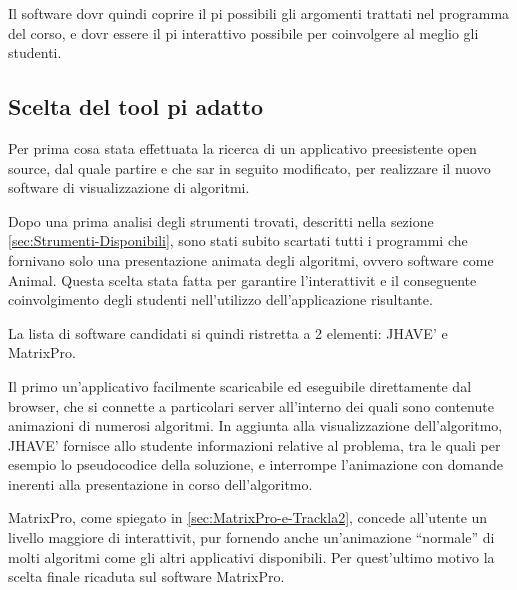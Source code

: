 Il software dovr quindi coprire il pi possibili gli argomenti trattati
nel programma del corso, e dovr essere il pi interattivo possibile
per coinvolgere al meglio gli studenti.


\subsection{Scelta del tool pi adatto}

Per prima cosa  stata effettuata la ricerca di un applicativo preesistente
open source, dal quale partire e che sar in seguito modificato, per
realizzare il nuovo software di visualizzazione di algoritmi.

Dopo una prima analisi degli strumenti trovati, descritti nella sezione
\ref{sec:Strumenti-Disponibili}, sono stati subito scartati tutti
i programmi che fornivano solo una presentazione animata degli algoritmi,
ovvero software come Animal. Questa scelta  stata fatta per garantire
l'interattivit e il conseguente coinvolgimento degli studenti nell'utilizzo
dell'applicazione risultante.

La lista di software candidati si  quindi ristretta a 2 elementi:
JHAVE' e MatrixPro.

Il primo  un'applicativo facilmente scaricabile ed eseguibile direttamente
dal browser, che si connette a particolari server all'interno dei
quali sono contenute animazioni di numerosi algoritmi. In aggiunta
alla visualizzazione dell'algoritmo, JHAVE' fornisce allo studente
informazioni relative al problema, tra le quali per esempio lo pseudocodice
della soluzione, e interrompe l'animazione con domande inerenti alla
presentazione in corso dell'algoritmo.

MatrixPro, come spiegato in \ref{sec:MatrixPro-e-Trackla2}, concede
all'utente un livello maggiore di interattivit, pur fornendo anche
un'animazione {}``normale'' di molti algoritmi come gli altri applicativi
disponibili. Per quest'ultimo motivo la scelta finale  ricaduta sul
software MatrixPro.
